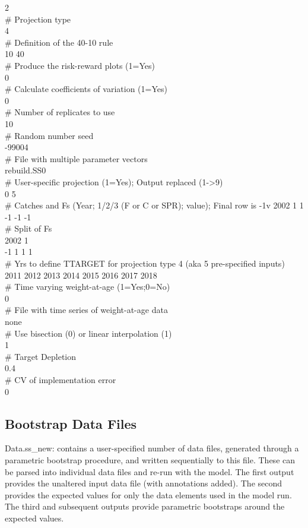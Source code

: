 2\\
\# Projection type\\
4\\
\# Definition of the 40-10 rule\\
10 40\\
\# Produce the risk-reward plots (1=Yes)\\
0\\
\# Calculate coefficients of variation (1=Yes)\\
0\\
\# Number of replicates to use\\
10\\
\# Random number seed\\
-99004\\
\# File with multiple parameter vectors \\
rebuild.SS0\\
\# User-specific projection (1=Yes); Output replaced (1->9)\\
0  5  \\
\# Catches and Fs (Year; 1/2/3 (F or C or SPR); value); Final row is -1v
2002 1 1\\
-1 -1 -1\\
\# Split of Fs\\
2002 1\\
-1  1 1 1\\ 
\# Yrs to define TTARGET for projection type 4 (aka 5 pre-specified inputs)\\
2011 2012 2013 2014 2015 2016 2017 2018 \\
\# Time varying weight-at-age (1=Yes;0=No)\\
0\\
\# File with time series of weight-at-age data\\
none\\
\# Use bisection (0) or linear interpolation (1)\\
1\\
\# Target Depletion\\
0.4\\
\# CV of implementation error\\
0\\

\subsection{Bootstrap Data Files}
Data.ss\_new:  contains a user-specified number of data files, generated through a parametric bootstrap procedure, and written sequentially to this file.  These can be parsed into individual data files and re-run with the model.  The first output provides the unaltered input data file (with annotations added).  The second provides the expected values for only the data elements used in the model run.  The third and subsequent outputs provide parametric bootstraps around the expected values.

